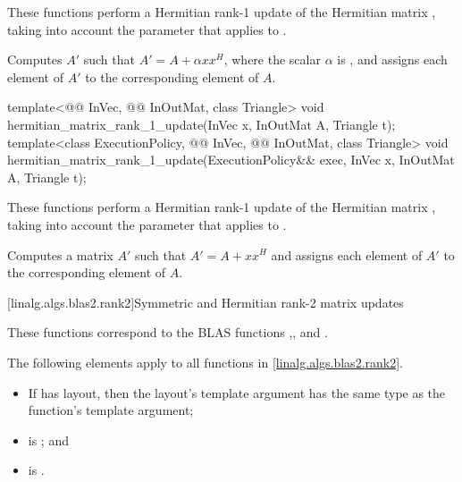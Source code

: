 \begin{itemdescr}
\pnum
These functions perform
a Hermitian rank-1 update of the Hermitian matrix ,
taking into account the  parameter
that applies to .

\pnum
\effects
Computes $A'$ such that
$A' = A + \alpha x x^H$, where the scalar $\alpha$ is ,
and assigns each element of $A'$ to the corresponding element of $A$.
\end{itemdescr}

\begin{itemdecl}
template<@@ InVec, @@ InOutMat, class Triangle>
  void hermitian_matrix_rank_1_update(InVec x, InOutMat A, Triangle t);
template<class ExecutionPolicy,
         @@ InVec, @@ InOutMat, class Triangle>
  void hermitian_matrix_rank_1_update(ExecutionPolicy&& exec, InVec x, InOutMat A, Triangle t);
\end{itemdecl}

\begin{itemdescr}
\pnum
These functions perform
a Hermitian rank-1 update of the Hermitian matrix ,
taking into account the  parameter
that applies to .

\pnum
\effects
Computes a matrix $A'$ such that $A' = A + x x^H$ and
assigns each element of $A'$ to the corresponding element of $A$.
\end{itemdescr}

[linalg.algs.blas2.rank2]{Symmetric and Hermitian rank-2 matrix updates}

\pnum
\begin{note}
These functions correspond to the BLAS functions
,,  and \supercite{blas2}.
\end{note}

\pnum
The following elements apply to all functions in \ref{linalg.algs.blas2.rank2}.

\pnum
\mandates
\begin{itemize}
\item
If  has  layout,
then the layout's  template argument has
the same type as the function's  template argument;
\item
{}
is ; and
\item
{}
is .
\end{itemize}


